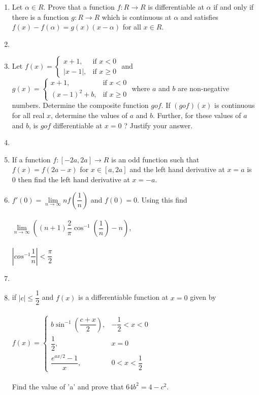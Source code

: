 \documentclass[journal,12pt,twocolumn]{IEEEtran}
\begin{document}
\begin{enumerate}
\item Let $\alpha \in R$. Prove that a function $f:R \to R$ is differentiable at $\alpha$ if and only if there is a function $g: R \to R$ which is continuous at $\alpha$ and satisfies $f(x)-f(\alpha)=g(x)(x-\alpha)$ for all $x \in R$. \item[~]

\item Let $f(x)=\begin{cases}
x+1, &\text{if $x<0$}\\
|x-1|, &\text{if $x\geq 0$}
\end{cases}$ and\\ $g(x)=\begin{cases}
x+1, &\text{if $x<0$}\\
(x-1)^2+b, &\text{if $x\geq 0$}
\end{cases}$ where $a$ and $b$ are non-negative numbers. Determine the composite function $g o f$. If $(g o f) (x)$ is continuous for all real $x$, determine the values of $a$ and $b$. Further, for these values of $a$ and $b$, is $g o f$ differentiable at $x=0$ ? Justify your answer. \item[~]

\item If a function $f:[-2a,2a] \to R$ is an odd function such that $f(x)=f(2a-x)$ for $x \in [a,2a]$ and the left hand derivative at $x=a$ is 0 then find the left hand derivative at $x=-a$.

\item $f'(0)=\lim\limits_{n \to \infty}nf\left(\dfrac{1}{n}\right)$ and $f(0)=0$. Using this find\\ \\ $\lim\limits_{n \to \infty}\left((n+1)\dfrac{2}{\pi}\cos^{-1}\left(\dfrac{1}{n}\right)-n\right)$, \\ \\$\left|cos^{-1}\dfrac{1}{n}\right| < \dfrac{\pi}{2}$

\item[~] \item if $|c|\leq\dfrac{1}{2}$ and $f(x)$ is a differentiable function at $x=0$ given by \\ \\
$f(x)=\begin{cases}
b\sin^{-1}\left(\dfrac{c+x}{2}\right), &\text{$-\dfrac{1}{2}<x<0$}\\
\dfrac{1}{2}, &\text{$x=0$}\\
\dfrac{e^{ax/2}-1}{x}, &\text{$0<x<\dfrac{1}{2}$}
\end{cases}$\\ \\
Find the value of 'a' and prove that $64b^2=4-c^2$.\\


\end{enumerate}
\end{document}
